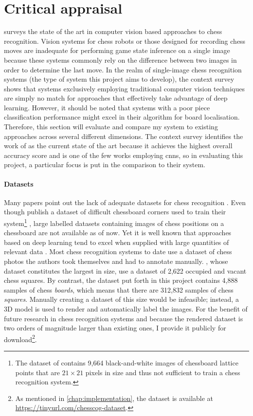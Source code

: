 \documentclass[../report.tex]{subfiles}
\begin{document}
\section{Critical appraisal}
 surveys the state of the art in computer vision based approaches to chess recognition. 
Vision systems for chess robots or those designed for recording chess moves are inadequate for performing game state inference on a single image because these systems commonly rely on the difference between two images in order to determine the last move.
In the realm of single-image chess recognition systems (the type of system this project aims to develop), the context survey shows that systems exclusively employing traditional computer vision techniques are simply no match for approaches that effectively take advantage of deep learning.
However, it should be noted that systems with a poor piece classification performance might excel in their algorithm for board localisation.
Therefore, this section will evaluate and compare my system to existing approaches across several different dimensions.
The context survey identifies the work of \textcite{mehta2020} as the current state of the art because it achieves the highest overall accuracy score and is one of the few works employing \glspl{cnn}, so in evaluating this project, a particular focus is put in the comparison to their system.

\paragraph{Datasets}
Many papers point out the lack of adequate datasets for chess recognition \cite{czyzewski2020,ding2016,mehta2020}.
Even though \citeauthor{czyzewski2018} publish a dataset \cite{czyzewski2018} of difficult chessboard corners used to train their system\footnote{The dataset of \citeauthor{czyzewski2018} contains 9,664 black-and-white images of chessboard lattice points that are $21\times 21$ pixels in size and thus not sufficient to train a chess recognition system.} \cite{czyzewski2020}, large labelled datasets containing images of chess positions on a chessboard are not available as of now.
Yet it is well known that approaches based on deep learning tend to excel when supplied with large quantities of relevant data \cite{halevy2009}.
Most chess recognition systems to date use a dataset of chess photos the authors took themselves and had to annotate manually.
\Textcite{mehta2020}, whose dataset constitutes the largest in size, use a dataset of 2,622 occupied and vacant chess squares.
By contrast, the dataset put forth in this project contains 4,888 samples of chess \emph{boards}, which means that there are 312,832 samples of chess \emph{squares}.
Manually creating a dataset of this size would be infeasible; instead, a 3D model is used to render and automatically label the images.
For the benefit of future research in chess recognition systems and because the rendered dataset is two orders of magnitude larger than existing ones, I provide it publicly for download\footnote{As mentioned in \cref{chap:implementation}, the dataset is available at \url{https://tinyurl.com/chesscog-dataset}.}.
\end{document}
